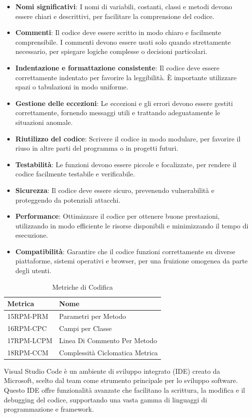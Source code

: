 \begin{itemize}
  \item \textbf{Nomi significativi}: I nomi di variabili, costanti, classi e metodi devono essere chiari e descrittivi, per facilitare la comprensione del codice.
  \item \textbf{Commenti}: Il codice deve essere scritto in modo chiaro e facilmente comprensibile. I commenti devono essere usati solo quando strettamente necessario, per spiegare logiche complesse o decisioni particolari.
  \item \textbf{Indentazione e formattazione consistente}: Il codice deve essere correttamente indentato per favorire la leggibilità. È importante utilizzare spazi o tabulazioni in modo uniforme.
  \item \textbf{Gestione delle eccezioni}: Le eccezioni e gli errori devono essere gestiti correttamente, fornendo messaggi utili e trattando adeguatamente le situazioni anomale.
  \item \textbf{Riutilizzo del codice}: Scrivere il codice in modo modulare, per favorire il riuso in altre parti del programma o in progetti futuri.
  \item \textbf{Testabilità}: Le funzioni devono essere piccole e focalizzate, per rendere il codice facilmente testabile e verificabile.
  \item \textbf{Sicurezza}: Il codice deve essere sicuro, prevenendo vulnerabilità e proteggendo da potenziali attacchi.
  \item \textbf{Performance}: Ottimizzare il codice per ottenere buone prestazioni, utilizzando in modo efficiente le risorse disponibili e minimizzando il tempo di esecuzione.
  \item \textbf{Compatibilità}: Garantire che il codice funzioni correttamente su diverse piattaforme, sistemi operativi e browser, per una fruizione omogenea da parte degli utenti.
\end{itemize}

\begin{table}[h!]
    \centering
    \renewcommand{\arraystretch}{1.5}
    \begin{tabular}{|l|l|}
        \hline
        \textbf{Metrica} & \textbf{Nome} \\
        \hline
        15RPM-PRM & Parametri per Metodo \\
        \hline
        16RPM-CPC & Campi per Classe \\
        \hline
        17RPM-LCPM & Linea Di Commento Per Metodo \\
        \hline
        18RPM-CCM & Complessità Ciclomatica Metrica \\
        \hline
    \end{tabular}
    \caption{Metriche di Codifica}
    \label{tab:metriches_codifica}
\end{table}


Visual Studio Code è un ambiente di sviluppo integrato (IDE) creato da Microsoft, scelto dal team come strumento principale per lo sviluppo software. Questo IDE offre funzionalità avanzate che facilitano la scrittura, la modifica e il debugging del codice, supportando una vasta gamma di linguaggi di programmazione e framework.

